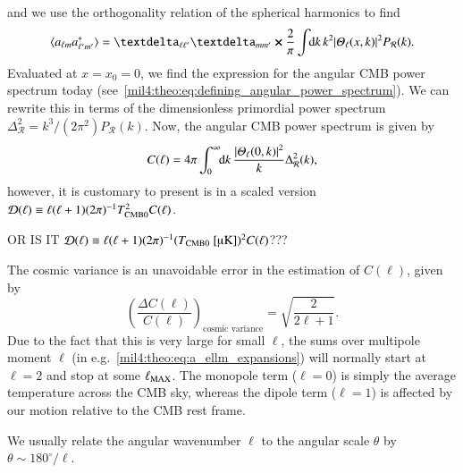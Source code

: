 and we use the orthogonality relation of the spherical harmonics to find
\begin{equation}
    \langle a\ellm a^*\ellmp \rangle = \deltasym{\ell \ell'} \deltasym{m m'} \cross \frac{2}{\pi}\int \dx{k} k^2  \abs{\Theta_{\ell}(x,k)}^2P_\mathcal{R}(k).
\end{equation}
Evaluated at $x=x_0=0$, we find the expression for the angular CMB power spectrum today (see~\cref{mil4:theo:eq:defining_angular_power_spectrum}). We can rewrite this in terms of the dimensionless primordial power spectrum $\Delta^2_\mathcal{R} = k^3/(2\pi^2) P_\mathcal{R}(k)$. Now, the angular CMB power spectrum is given by
\begin{equation}\label{mil4:theo:eq:C_of_ell_final}
    C(\ell) = 4\pi \int_0^{\infty} \!\!\mathop{}\!\mathrm{d} {k}\, \frac{\abs{\varTheta_\ell(0,k)}^2}{k} \Delta_\mathcal{R}^2(k),
\end{equation}
however, it is customary to present is in a scaled version $\mathcal{D}(\ell) \equiv \ell (\ell +1) (2\pi)^{-1} T_{\mathrm{CMB}0}^2 C(\ell)$.

OR IS IT $\mathcal{D}(\ell) \equiv \ell (\ell +1) (2\pi)^{-1} (\TCMB\unit{[\text{\textmu} K]})^2 C(\ell)$???

The cosmic variance is an unavoidable error in the estimation of $C(\ell)$, given by 
\begin{equation}\label{mil4:theo:eq:cosmic_variance}
    \left( \frac{\Delta C(\ell)}{C(\ell)}\right)_\text{cosmic variance} = \sqrt{\frac{2}{2\ell +1}}.
\end{equation}
Due to the fact that this is very large for small $\ell$, the sums over multipole moment $\ell$ (in e.g.~\cref{mil4:theo:eq:a_ellm_expansions}) will normally start at $\ell=2$ and stop at some $\ell_\mathrm{MAX}$. The monopole term ($\ell=0$) is simply the average temperature across the CMB sky, whereas the dipole term ($\ell=1$) is affected by our motion relative to the CMB rest frame. 

We usually relate the angular wavenumber $\ell$ to the angular scale $\theta$ by $\theta \sim 180^{\circ} /\ell$. 


